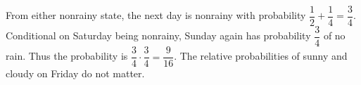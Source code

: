 From either nonrainy state, the next day is nonrainy with probability $\dfrac{1}{2}+\dfrac{1}{4}=\dfrac{3}{4}$. Conditional on Saturday being nonrainy, Sunday again has probability $\dfrac{3}{4}$ of no rain. Thus the probability is $\boxed{\dfrac{3}{4}\cdot\dfrac{3}{4}=\dfrac{9}{16}}$. The relative probabilities of sunny and cloudy on Friday do not matter.
